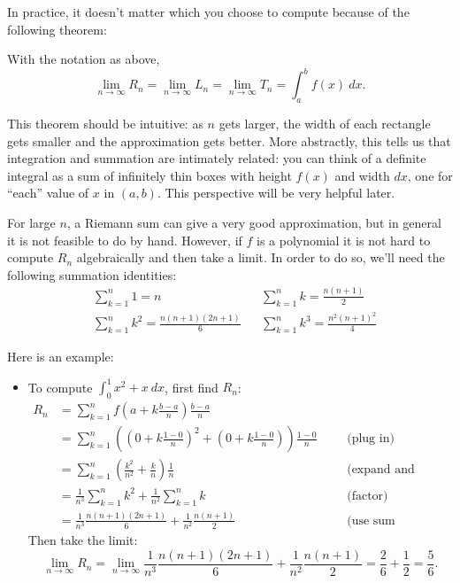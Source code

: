 In practice, it doesn't matter which you choose to compute because of the following theorem:
\begin{thm} With the notation as above,
$$\lim_{n\to\infty}R_n=\lim_{n\to\infty}L_n=\lim_{n\to\infty}T_n=\int_a^bf(x)\ dx.$$
\end{thm}

This theorem should be intuitive: as $n$ gets larger, the width of each rectangle gets smaller and the approximation gets better. More abstractly, this tells us that integration and summation are intimately related: you can think of a definite integral as a sum of infinitely thin boxes with height $f(x)$ and width $dx$, one for ``each'' value of $x$ in $(a,b)$. This perspective will be very helpful later. 

For large $n$, a Riemann sum can give a very good approximation, but in general it is not feasible to do by hand. However, if $f$ is a polynomial it is not hard to compute $R_n$ algebraically and then take a limit. In order to do so, we'll need the following summation identities:
\begin{align*}
&\sum_{k=1}^n 1 = n 
& &
\sum_{k=1}^n k = \frac{n(n+1)}{2}\\
&\sum_{k=1}^n k^2 = \frac{n(n+1)(2n+1)}{6}
& &
\sum_{k=1}^n k^3 = \frac{n^2(n+1)^2}{4}
\end{align*}

Here is an example:
\begin{itemize}
    \item To compute $\int_{0}^{1}x^2+x\ dx$, first find $R_n$:
    \begin{align*}
        R_n
        & = \sum_{k=1}^{n}f\left(a+k\frac{b-a}{n}\right)\frac{b-a}{n}\\ 
        & = \sum_{k=1}^n\left(\left(0+k\frac{1-0}{n}\right)^2 + \left(0+k\frac{1-0}{n}\right)\right)\frac{1-0}{n}&&&\text{(plug in)}\\
        & = \sum_{k=1}^n\left(\frac{k^2}{n^2} + \frac{k}{n}\right)\frac{1}{n} &&&\text{(expand and simplify)}\\
        & = \frac{1}{n^3}\sum_{k=1}^nk^2+\frac{1}{n^2}\sum_{k=1}^nk &&& \text{(factor)}\\
        & = \frac{1}{n^3}\frac{n(n+1)(2n+1)}{6}+\frac{1}{n^2}\frac{n(n+1)}{2} &&&\text{(use sum identities)}
    \end{align*}
    Then take the limit:
    $$\lim_{n\to\infty}R_n=\lim_{n\to\infty} \frac{1}{n^3}\frac{n(n+1)(2n+1)}{6}+\frac{1}{n^2}\frac{n(n+1)}{2} = \frac{2}{6} + \frac{1}{2} = \frac{5}{6}.$$
    
\end{itemize}

